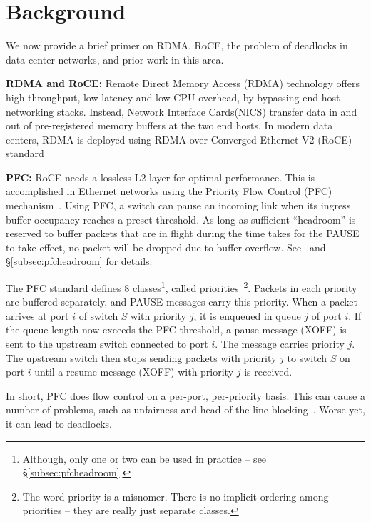 \section{Background}
\label{sec:background}

We now provide a brief primer on RDMA, RoCE, the problem of deadlocks in data
center networks, and prior work in this area.

{\bf RDMA and RoCE:} Remote Direct Memory Access (RDMA) technology offers high
throughput, low latency and low CPU overhead, by bypassing end-host networking
stacks. Instead, Network Interface Cards(NICS) transfer data in and out of
pre-registered memory buffers at the two end hosts.  In modern data centers,
RDMA is deployed using RDMA over Converged Ethernet V2 (RoCE)
standard~\cite{roce,rroce}

{\bf PFC:} RoCE needs a lossless L2 layer for optimal performance. This is
accomplished in Ethernet networks using the Priority Flow Control (PFC)
mechanism~\cite{pfc}.  Using PFC, a switch can pause an incoming link when its
ingress buffer occupancy reaches a preset threshold. As long as sufficient
``headroom'' is reserved to buffer packets that are in flight during the time
takes for the PAUSE to take effect, no packet will be dropped due to buffer
overflow. See~\cite{cisco-whitepaper,dcqcn} and \S\ref{subsec:pfcheadroom} for
details. 

The PFC standard defines 8 classes\footnote{Although, only one or two can be
used in practice -- see \S\ref{subsec:pfcheadroom}.}, called priorities~\footnote{The word priority is a
misnomer. There is no implicit ordering among priorities -- they are really just
separate classes.}. Packets in each priority are buffered separately, and PAUSE
messages carry this priority.  When a packet arrives at port $i$ of switch $S$
with priority $j$, it is enqueued in queue $j$ of port $i$. If the queue length
now exceeds the PFC threshold, a pause message (XOFF) is sent to the upstream
switch connected to port $i$. The message carries priority $j$. The upstream
switch then stops sending packets with priority $j$ to switch $S$ on port $i$ until a resume
message (XOFF) with priority $j$ is received.

In short, PFC does flow control on a per-port, per-priority basis. This can
cause a number of problems, such as unfairness and
head-of-the-line-blocking~\cite{dcqcn}. Worse yet, it can lead to deadlocks.



